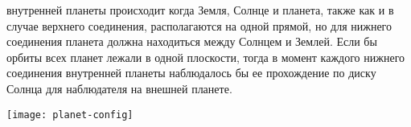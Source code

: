 \begin{minipage}{0.36\tw}
 внутренней планеты происходит когда Земля, Солнце и планета, также как и в случае верхнего соединения, располагаются на одной прямой, но для нижнего соединения планета должна находиться между Солнцем и Землей. Если бы орбиты всех планет лежали в одной плоскости, тогда в момент каждого нижнего соединения внутренней планеты наблюдалось бы ее прохождение по диску Солнца для наблюдателя на внешней планете.
\end{minipage}
\begin{minipage}{0.63\tw}
	\centering
	\vspace{-1pc}
	\texttt{[image: planet-config]}
%
%
%  
%
%
%    
%    
%
%

\end{minipage}
